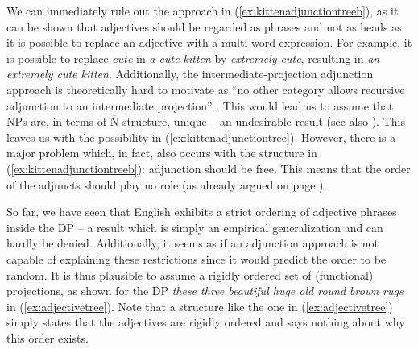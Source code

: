 \noindent We can immediately rule out the approach in (\ref{ex:kittenadjunctiontreeb}), as it can be shown that adjectives should be regarded as phrases and not as heads as it is possible to replace an adjective with a multi-word expression. For example, it is possible to replace \textit{cute} in \textit{a cute kitten} by \textit{extremely cute}, resulting in \textit{an extremely cute kitten}. Additionally, the intermediate-projection adjunction approach is theoretically hard to motivate as ``no other category allows recursive adjunction to an intermediate projection'' \citep[94]{scott2002stacked}. This would lead us to assume that NPs are, in terms of $\overline{\textrm{N}}$ structure, unique -- an undesirable result (see also \citealt{abney1987english}). This leaves us with the possibility in (\ref{ex:kittenadjunctiontree}). However, there is a major problem which, in fact, also occurs with the structure in (\ref{ex:kittenadjunctiontreeb}): adjunction should be free. This means that the order of the adjuncts should play no role (as already argued on page \pageref{generaladjunction}).

So far, we have seen that English exhibits a strict ordering of adjective phrases inside the DP -- a result which is simply an empirical generalization and can hardly be denied. Additionally, it seems as if an adjunction approach is not capable of explaining these restrictions since it would predict the order to be random. It is thus plausible to assume a rigidly ordered set of (functional) projections, as shown for the DP \textit{these three beautiful huge old round brown rugs} in (\ref{ex:adjectivetree}). Note that a structure like the one in (\ref{ex:adjectivetree}) simply states that the adjectives are rigidly ordered and says nothing about why this order exists. 



